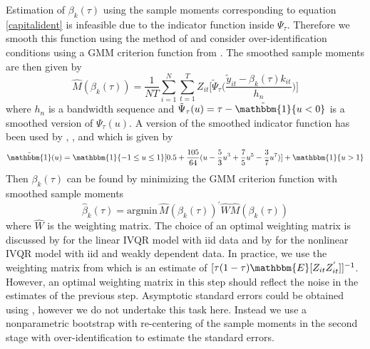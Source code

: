\documentclass[11pt]{article}
\begin{document}
Estimation of $\beta_{k}(\tau)$ using the sample moments corresponding to equation \eqref{capitalident} is infeasible due to the indicator function inside $\Psi_{\tau}$. Therefore we smooth this function using the method of \cite{Kaplan2016} and consider over-identification conditions using a GMM criterion function from \cite{qgmm}. The smoothed sample moments are then given by
\begin{equation}
\hat{M}(\beta_{k}(\tau))=\frac{1}{NT}\sum_{i=1}^{N}\sum_{t=1}^{T}Z_{it}\Bigg[\tilde{\Psi}_{\tau}\Bigg(\frac{\tilde{y}_{it}-\beta_{k}(\tau)k_{it}}{h_{n}}\Bigg)\Bigg]
\end{equation}
where $h_{n}$ is a bandwidth sequence and $\tilde{\Psi}_{\tau}(u)=\tau-\tilde{\mathbbm{1}}\{u<0\}$ is a smoothed version of $\Psi_{\tau}(u)$. A version of the smoothed indicator function has been used by \cite{Horowitz1998}, \cite{Whang2006}, and \cite{Kaplan2016} which is given by
\begin{equation*}
\tilde{\mathbbm{1}}(u)=\mathbbm{1}\{-1\leq u\leq 1\}[0.5+\frac{105}{64}(u-\frac{5}{3}u^{3}+\frac{7}{5}u^{5}-\frac{3}{7}u^{7})]+\mathbbm{1}\{u>1\}
\end{equation*}
Then $\beta_{k}(\tau)$ can be found by minimizing the GMM criterion function with smoothed sample moments
\begin{equation*}
\hat{\beta}_{k}(\tau)=\text{argmin}\, \hat{M}(\beta_{k}(\tau))^{'}\hat{W}\hat{M}(\beta_{k}(\tau))
\end{equation*}
where $\hat{W}$ is the weighting matrix. The choice of an optimal weighting matrix is discussed by \cite{Kaplan2016} for the linear IVQR model with iid data and by \cite{qgmm} for the nonlinear IVQR model with iid and weakly dependent data. In practice, we use the weighting matrix from \cite{Kaplan2016} which is an estimate of $[\tau(1-\tau)\mathbbm{E}[Z_{it}Z^{'}_{it}]]^{-1}$. However, an optimal weighting matrix in this step should reflect the noise in the estimates of the previous step. Asymptotic standard errors could be obtained using \cite{Ackerberg2014}, however we do not undertake this task here. Instead we use a nonparametric bootstrap with re-centering of the sample moments in the second stage with over-identification to estimate the standard errors. 
\end{document}
